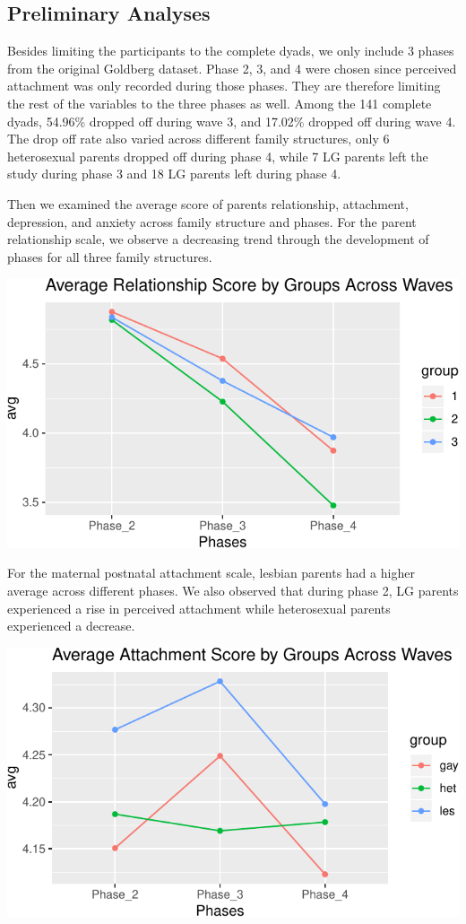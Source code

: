\documentclass[man]{apa6}
\begin{document}
\hypertarget{preliminary-analyses}{%
\subsection{Preliminary Analyses}\label{preliminary-analyses}}

Besides limiting the participants to the complete dyads, we only include 3 phases from the original Goldberg dataset. Phase 2, 3, and 4 were chosen since perceived attachment was only recorded during those phases. They are therefore limiting the rest of the variables to the three phases as well. Among the 141 complete dyads, 54.96\% dropped off during wave 3, and 17.02\% dropped off during wave 4. The drop off rate also varied across different family structures, only 6 heterosexual parents dropped off during phase 4, while 7 LG parents left the study during phase 3 and 18 LG parents left during phase 4.

Then we examined the average score of parents relationship, attachment, depression, and anxiety across family structure and phases. For the parent relationship scale, we observe a decreasing trend through the development of phases for all three family structures.

\includegraphics{measures_descriptive_stats_files/figure-latex/fig1-1.pdf}

For the maternal postnatal attachment scale, lesbian parents had a higher average across different phases. We also observed that during phase 2, LG parents experienced a rise in perceived attachment while heterosexual parents experienced a decrease.

\includegraphics{measures_descriptive_stats_files/figure-latex/fig2-1.pdf}
\end{document}
